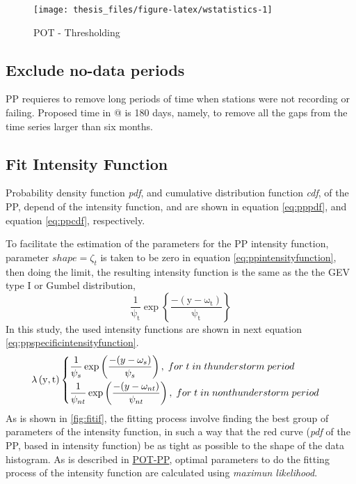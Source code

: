 \documentclass[12pt,oneside]{reedthesis}
\begin{document}
\footnotesize
\begin{figure}

{\centering \texttt{[image: thesis\_files/figure-latex/wstatistics-1]} 

}

\caption{POT - Thresholding}\label{fig:wstatistics}
\end{figure}
\normalsize

\hypertarget{exclude-no-data-periods}{%
\subsection{Exclude no-data periods}\label{exclude-no-data-periods}}

PP requieres to remove long periods of time when stations were not recording or failing. Proposed time in @\cite{Pintar2015} is 180 days, namely, to remove all the gaps from the time series larger than six months.

\hypertarget{fit-intensity-function}{%
\subsection{Fit Intensity Function}\label{fit-intensity-function}}

Probability density function \emph{pdf}, and cumulative distribution function \emph{cdf}, of the PP, depend of the intensity function, and are shown in equation \eqref{eq:pppdf}, and equation \eqref{eq:ppcdf}, respectively.

To facilitate the estimation of the parameters for the PP intensity function, parameter \(shape = \zeta_t\) is taken to be zero in equation \eqref{eq:ppintensityfunction}, then doing the limit, the resulting intensity function is the same as the the GEV type I or Gumbel distribution,
\begin{equation}
  \mathrm{
          \frac{1}{\psi_t}\exp\left\{\frac{-(y-\omega_t)}{\psi_t}\right\}
         }
  \label{eq:ppusedif}
\end{equation}
In this study, the used intensity functions are shown in next equation \eqref{eq:ppspecificintensityfunction}.
\begin{equation}
  \mathrm{
    \lambda\left(y,t\right)
    \begin{cases}
      \begin{split}
            &\frac{1}{\psi_s}\exp\left(\frac{-(y-\omega_s)}{\psi_s}\right),\;for\;t\;in\;thunderstorm\;period
            \\
            &\frac{1}{\psi_{nt}}\exp\left(\frac{-(y-\omega_{nt})}{\psi_{nt}}\right),\;for\;t\;in\;non\-thunderstorm\;period      
      \end{split}
    \end{cases}
  }
  \label{eq:ppspecificintensityfunction}
\end{equation}
As is shown in \ref{fig:fitif}, the fitting process involve finding the best group of parameters of the intensity function, in such a way that the red curve (\emph{pdf} of the PP, based in intensity function) be as tight as possible to the shape of the data histogram. As is described in \protect\hyperlink{pot-pp}{POT-PP}, optimal parameters to do the fitting process of the intensity function are calculated using \emph{maximun likelihood}.
\end{document}

